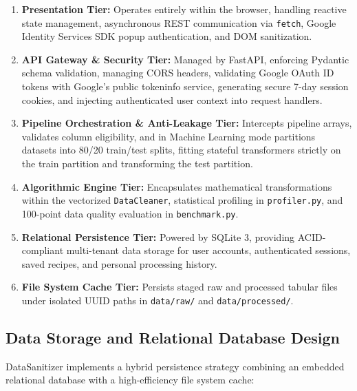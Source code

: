 \begin{enumerate}
  \item \textbf{Presentation Tier:} Operates entirely within the browser, handling reactive state management, asynchronous REST communication via \texttt{fetch}, Google Identity Services SDK popup authentication, and DOM sanitization.
  \item \textbf{API Gateway \& Security Tier:} Managed by FastAPI, enforcing Pydantic schema validation, managing CORS headers, validating Google OAuth ID tokens with Google's public tokeninfo service, generating secure 7-day session cookies, and injecting authenticated user context into request handlers.
  \item \textbf{Pipeline Orchestration \& Anti-Leakage Tier:} Intercepts pipeline arrays, validates column eligibility, and in Machine Learning mode partitions datasets into 80/20 train/test splits, fitting stateful transformers strictly on the train partition and transforming the test partition.
  \item \textbf{Algorithmic Engine Tier:} Encapsulates mathematical transformations within the vectorized \texttt{DataCleaner}, statistical profiling in \texttt{profiler.py}, and 100-point data quality evaluation in \texttt{benchmark.py}.
  \item \textbf{Relational Persistence Tier:} Powered by SQLite 3, providing ACID-compliant multi-tenant data storage for user accounts, authenticated sessions, saved recipes, and personal processing history.
  \item \textbf{File System Cache Tier:} Persists staged raw and processed tabular files under isolated UUID paths in \texttt{data/raw/} and \texttt{data/processed/}.
\end{enumerate}

\subsection{Data Storage and Relational Database Design}
DataSanitizer implements a hybrid persistence strategy combining an embedded relational database with a high-efficiency file system cache:

